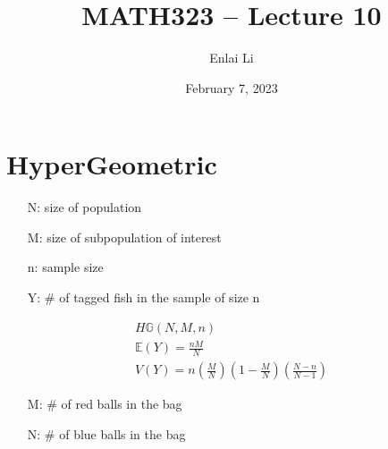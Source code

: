 \documentclass{article}
\author{Enlai Li}
\title{MATH323 -- Lecture 10}
\date{February 7, 2023}
\begin{document}
\maketitle
\section{HyperGeometric}
\begin{itemize}
    \item [N:] size of population
    \item [M:] size of subpopulation of interest
    \item [n:] sample size
    \item [Y:] \# of tagged fish in the sample of size n

\end{itemize}
\begin{gather*}
    H \mathbb{G}(N,M,n)\\
    \mathbb{E} (Y) = \frac{nM}{N}\\
    V(Y) = n (\frac{M}{N} )(1-\frac{M}{N} )(\frac{N-n}{N-1} )
\end{gather*}

\begin{itemize}
    \item [M:] \# of red balls in the bag
    \item [N:] \# of blue balls in the bag
\end{itemize}
\end{document}

